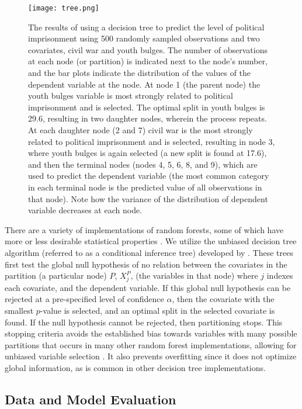 \documentclass[11pt]{article}
\begin{document}
\begin{figure}[!htpb]
\centering
\texttt{[image: tree.png]}
\caption{The results of using a decision tree to predict the level of political imprisonment using 500 randomly sampled observations and two covariates, civil war and youth bulges. The number of observations at each node (or partition) is indicated next to the node's number, and the bar plots indicate the distribution of the values of the dependent variable at the node. At node 1 (the parent node) the youth bulges variable is most strongly related to political imprisonment and is selected. The optimal split in youth bulges is 29.6, resulting in two daughter nodes, wherein the process repeats. At each daughter node (2 and 7) civil war is the most strongly related to political imprisonment and is selected, resulting in node 3, where youth bulges is again selected (a new split is found at 17.6), and then the terminal nodes (nodes 4, 5, 6, 8, and 9), which are used to predict the dependent variable (the most common category in each terminal node is the predicted value of all observations in that node). Note how the variance of the distribution of dependent variable decreases at each node.}
\label{fig:tree}
\end{figure}

There are a variety of implementations of random forests, some of which have more or less desirable statistical properties \citep{strobl2009introduction, siroky2009navigating}. We utilize the unbiased decision tree algorithm (referred to as a conditional inference tree) developed by \citet{hothorn2006unbiased}. These trees first test the global null hypothesis of no relation between the covariates in the partition (a particular node) $P$, $X_j^P$, (the variables in that node) where $j$ indexes each covariate, and the dependent variable. If this global null hypothesis can be rejected at a pre-specified level of confidence $\alpha$, then the covariate with the smallest $p$-value is selected, and an optimal split in the selected covariate is found. If the null hypothesis cannot be rejected, then partitioning stops. This stopping criteria avoids the established bias towards variables with many possible partitions that occurs in many other random forest implementations, allowing for unbiased variable selection \citep{hothorn2006unbiased, strobl2007bias}. It also prevents overfitting since it does not optimize global information, as is common in other decision tree implementations.

\subsection*{Data and Model Evaluation}
\end{document}
